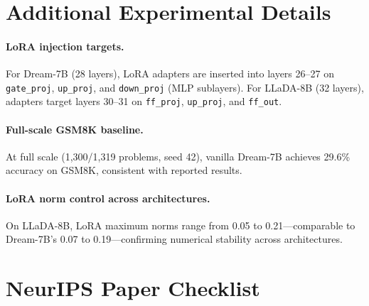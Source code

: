 \documentclass{article}
\begin{document}




\appendix

\section{Additional Experimental Details}
\label{app:details}

\paragraph{LoRA injection targets.} For Dream-7B (28 layers), LoRA adapters are inserted into layers 26--27 on \texttt{gate\_proj}, \texttt{up\_proj}, and \texttt{down\_proj} (MLP sublayers). For LLaDA-8B (32 layers), adapters target layers 30--31 on \texttt{ff\_proj}, \texttt{up\_proj}, and \texttt{ff\_out}.

\paragraph{Full-scale GSM8K baseline.} At full scale (1,300/1,319 problems, seed 42), vanilla Dream-7B achieves 29.6\% accuracy on GSM8K, consistent with reported results.

\paragraph{LoRA norm control across architectures.} On LLaDA-8B, LoRA maximum norms range from 0.05 to 0.21---comparable to Dream-7B's 0.07 to 0.19---confirming numerical stability across architectures.

\section*{NeurIPS Paper Checklist}
\end{document}
